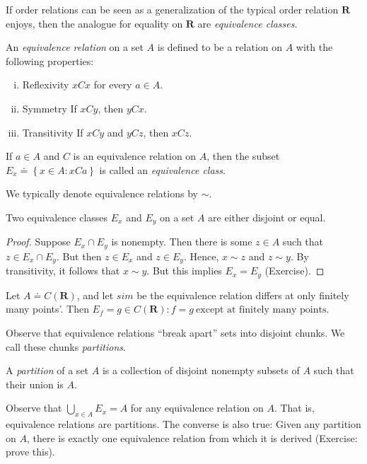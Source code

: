 If order relations can be seen as a generalization of the typical order relation
$\mathbf{R}$ enjoys, then the analogue for equality on $\mathbf{R}$ are \emph{equivalence
classes}.
\begin{definition}
An \emph{equivalence relation} on a set $A$ is defined to be a relation on $A$
with the following properties:
\begin{enumerate}[(i)]
  \item{Reflexivity} $xCx$ for every $a \in A$.
  \item{Symmetry} If $xCy$, then $yCx$.
  \item{Transitivity} If $xCy$ and $yCz$, then $xCz$.
\end{enumerate}
If $a \in A$ and $C$ is an equivalence relation on $A$, then
the subset $E_{x} \doteq \left\{ x \in A: xCa  \right\}$ is called
an \emph{equivalence class}.

We typically denote equivalence relations by $\sim$.
\end{definition}
\begin{lemma}\label{lem:}
Two equivalence classes $E_{x}$ and $E_{y}$ on a set $A$ are
either disjoint or equal.
\end{lemma}
\begin{proof}
Suppose $E_{x} \cap E_{y}$ is nonempty. Then there is some $z \in A$
such that $z \in E_{x} \cap E_{y}$. But then $z \in E_{x}$ and
$z \in E_{y}$. Hence, $x \sim z$ and $z \sim y$. By transitivity, it follows
that $x \sim y$. But this implies $E_{x} = E_{y}$ (Exercise).
\end{proof}
\begin{example}
Let $A \doteq C(\mathbf{R})$, and let $sim$ be the equivalence relation differs at
only finitely many points'. Then $E_{f} = {g \in C(\mathbf{R}): f=g \ \text{except at
finitely many points}}$.
\end{example}
Observe that equivalence relations ``break apart'' sets into disjoint chunks. We call
these chunks \emph{partitions}.
\begin{definition}
A \emph{partition} of a set $A$  is a collection of disjoint nonempty subsets of
$A$ such that their union is $A$.
\end{definition}
Observe that $\bigcup_{x \in A}  E_{x}  = A$ for any equivalence relation on
$A$. That is, equivalence relations are partitions. The converse is also true:
Given any partition on $A$, there is exactly one equivalence relation from
which it is derived (Exercise: prove this).

